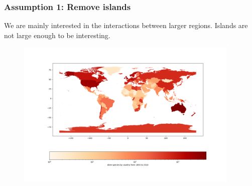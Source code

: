 \documentclass[
	11pt, %
]{beamer}
\begin{document}
\begin{frame}
\frametitle{Assumption 1: Remove islands}
We are mainly interested in the interactions between larger regions. Islands are not large enough to be interesting. 

\begin{figure}[H]
    \centering
    \includegraphics[width=0.95\textwidth]{region_invasion.png}
\end{figure}

\end{frame}
\end{document}
